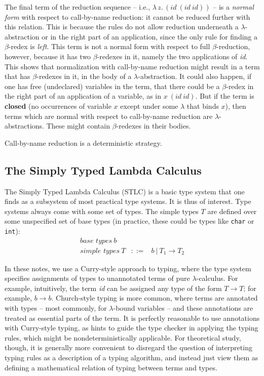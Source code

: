 \documentclass{article}
\begin{document}
The final term of the reduction sequence -- i.e.,
$\lambda\,z.\, (\textit{id}\ (\textit{id}\ \textit{id}))$ -- is a
\emph{normal form} with respect to call-by-name reduction: it cannot
be reduced further with this relation.  This is because the rules do
not allow reduction underneath a $\lambda$-abstraction or in the right
part of an application, since the only rule for finding a
$\beta$-redex is \textit{left}.  This term is not a normal form with
respect to full $\beta$-reduction, however, because it has two
$\beta$-redexes in it, namely the two applications of \textit{id}.
This shows that normalization with call-by-name reduction might result
in a term that has $\beta$-redexes in it, in the body of a
$\lambda$-abstraction.  It could also happen, if one has free (undeclared)
variables in the term, that there could be a $\beta$-redex in the right part
of an application of a variable, as in $x\ (\textit{id}\ \textit{id})$.
But if the term is \textbf{closed} (no occurrences of variable $x$
except under some $\lambda$ that binds $x$), then terms which are normal
with respect to call-by-name reduction are $\lambda$-abstractions.
These might contain $\beta$-redexes in their bodies.

Call-by-name reduction is a deterministic strategy.

\subsection{The Simply Typed Lambda Calculus}

The Simply Typed Lambda Calculus (STLC) is a basic type system that
one finds as a subsystem of most practical type systems.  It is thus
of interest.  Type systems always come with some set of types.  The
simple types $T$ are defined over some unspecified set of base types
(in practice, these could be types like \verb|char| or \verb|int|):
\begin{eqnarray*}
\textit{base types}\ b\ &\ & \\
\textit{simple types}\ T & ::= & b\ |\ T_1 \to T_2
\end{eqnarray*}

In these notes, we use a Curry-style approach to typing, where the
type system specifies assignments of types to unannotated terms of
pure $\lambda$-calculus.  For example, intuitively, the term
\textit{id} can be assigned any type of the form $T \to T$; for
example, $b \to b$.  Church-style typing is more common, where terms
are annotated with types -- most commonly, for $\lambda$-bound
variables -- and these annotations are treated as essential parts of
the term.  It is perfectly reasonable to use annotations with
Curry-style typing, as hints to guide the type checker in applying the
typing rules, which might be nondeterministically applicable.  For
theoretical study, though, it is generally more convenient to disregard
the question of interpreting typing rules as a description of a typing
algorithm, and instead just view them as defining a mathematical relation
of typing between terms and types.
\end{document}
